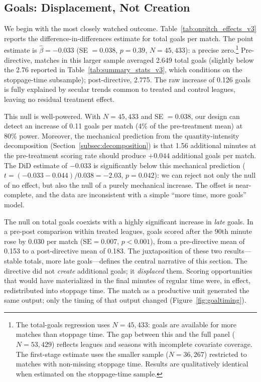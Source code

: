 \documentclass[12pt]{article}
\begin{document}
\subsection{Goals: Displacement, Not Creation}
\label{subsec:goals}

We begin with the most closely watched outcome. Table~\ref{tab:onpitch_effects_v3} reports the difference-in-differences estimate for total goals per match. The point estimate is $\hat{\beta} = -0.033$ (SE $= 0.038$, $p = 0.39$, $N = 45{,}433$): a precise zero.\footnote{The total-goals regression uses $N = 45{,}433$: goals are available for more matches than stoppage time. The gap between this and the full panel ($N = 53{,}429$) reflects leagues and seasons with incomplete covariate coverage. The first-stage estimate uses the smaller sample ($N = 36{,}267$) restricted to matches with non-missing stoppage time. Results are qualitatively identical when estimated on the stoppage-time sample.} Pre-directive, matches in this larger sample averaged 2.649 total goals (slightly below the 2.76 reported in Table~\ref{tab:summary_stats_v3}, which conditions on the stoppage-time subsample); post-directive, 2.775. The raw increase of 0.126 goals is fully explained by secular trends common to treated and control leagues, leaving no residual treatment effect.

This null is well-powered. With $N = 45{,}433$ and SE $= 0.038$, our design can detect an increase of 0.11 goals per match (4\% of the pre-treatment mean) at 80\% power. Moreover, the mechanical prediction from the quantity-intensity decomposition (Section~\ref{subsec:decomposition}) is that 1.56 additional minutes at the pre-treatment scoring rate should produce $+0.044$ additional goals per match. The DiD estimate of $-0.033$ is significantly below this mechanical prediction ($t = (-0.033 - 0.044)/0.038 = -2.03$, $p = 0.042$): we can reject not only the null of no effect, but also the null of a purely mechanical increase. The offset is near-complete, and the data are inconsistent with a simple ``more time, more goals'' model.

The null on total goals coexists with a highly significant increase in \emph{late} goals. In a pre-post comparison within treated leagues, goals scored after the 90th minute rose by 0.030 per match ($\text{SE} = 0.007$, $p < 0.001$), from a pre-directive mean of 0.153 to a post-directive mean of 0.183. The juxtaposition of these two results---stable totals, more late goals---defines the central narrative of this section. The directive did not \emph{create} additional goals; it \emph{displaced} them. Scoring opportunities that would have materialized in the final minutes of regular time were, in effect, redistributed into stoppage time. The match as a productive unit generated the same output; only the timing of that output changed (Figure~\ref{fig:goaltiming}).
\end{document}
